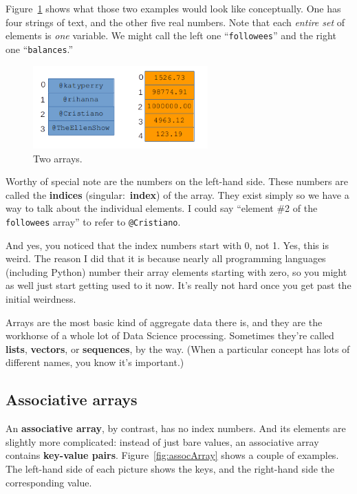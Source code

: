 Figure~\ref{fig:array} shows what those two examples would look like
conceptually. One has four strings of text, and the other five real numbers.
Note that each \textit{entire set} of elements is \textit{one} variable. We
might call the left one ``\texttt{followees}'' and the right one
``\texttt{balances}.''

\begin{figure}[ht]
\centering
\includegraphics[width=0.6\textwidth]{array.png}
\caption{Two arrays.}
\label{fig:array}
\end{figure}

\label{arrayIndex}

Worthy of special note are the numbers on the left-hand side. These numbers
are called the \textbf{indices} (singular:~\textbf{index}) of the array.
They exist simply so we have a way to talk about the individual elements. I
could say ``element \#2 of the \texttt{followees} array'' to refer to
\texttt{@Cristiano}.

And yes, you noticed that the index numbers start with 0, not 1. Yes, this is
weird. The reason I did that it is because nearly all programming languages
(including Python) number their array elements starting with zero, so you might
as well just start getting used to it now. It's really not hard once you get
past the initial weirdness.

Arrays are the most basic kind of aggregate data there is, and they are the
workhorse of a whole lot of Data Science processing. Sometimes they're called
\textbf{lists}, \textbf{vectors}, or \textbf{sequences}, by the way. (When a
particular concept has lots of different names, you know it's important.)

\subsection{Associative arrays}
\label{sec:assocArrays}

An \textbf{associative array}, by contrast, has no index numbers. And its
elements are slightly more complicated: instead of just bare values, an
associative array contains \textbf{key-value pairs}.
Figure~\ref{fig:assocArray} shows a couple of examples. The left-hand side of
each picture shows the keys, and the right-hand side the corresponding value.

